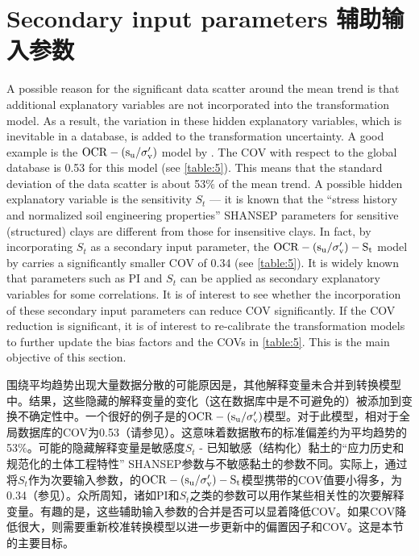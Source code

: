 \section{Secondary input parameters 辅助输入参数}

\begin{paracol}{2}

    A possible reason for the significant data scatter around the mean trend is that additional explanatory variables are not incorporated into the transformation model. As a result, the variation in these hidden explanatory variables, which is inevitable in a database, is added to the transformation uncertainty. A good example is the $\rm{OCR}-(s_u/\sigma_v')$ model by \citet{Jamiolkowski198557}. The COV with respect to the global database is 0.53 for this model (see \autoref{table:5}). This means that the standard deviation of the data scatter is about 53$\%$ of the mean trend. A possible hidden explanatory variable is the sensitivity $S_t$ — it is known that the “stress history and normalized soil engineering properties” SHANSEP parameters for sensitive (structured) clays are different from those for insensitive clays. In fact, by incorporating $S_t$ as a secondary input parameter, the $\rm{OCR}-(s_u/\sigma_v')-S_t$ model by \cite{Ching2012522}carries a significantly smaller COV of 0.34 (see \autoref{table:5}). It is widely known that parameters such as PI and $S_t$ can be applied as secondary explanatory variables for some correlations. It is of interest to see whether the incorporation of these secondary input parameters can reduce COV significantly. If the COV reduction is significant, it is of interest to re-calibrate the transformation models to further update the bias factors and the COVs in \autoref{table:5}. This is the main objective of this section.

    \switchcolumn

    围绕平均趋势出现大量数据分散的可能原因是，其他解释变量未合并到转换模型中。结果，这些隐藏的解释变量的变化（这在数据库中是不可避免的）被添加到变换不确定性中。一个很好的例子是\citet{Jamiolkowski198557}的$\rm{OCR}-(s_u/\sigma_v')$模型。对于此模型，相对于全局数据库的COV为0.53（请参见）。这意味着数据散布的标准偏差约为平均趋势的53$\%$。可能的隐藏解释变量是敏感度$S_t$ - 已知敏感（结构化）黏土的“应力历史和规范化的土体工程特性” SHANSEP参数与不敏感黏土的参数不同。实际上，通过将$S_t$作为次要输入参数，\cite{Ching2012522}的$\rm{OCR}-(s_u/\sigma_v')-S_t$模型携带的COV值要小得多，为0.34（参见）。众所周知，诸如PI和$S_t$之类的参数可以用作某些相关性的次要解释变量。有趣的是，这些辅助输入参数的合并是否可以显着降低COV。如果COV降低很大，则需要重新校准转换模型以进一步更新中的偏置因子和COV。这是本节的主要目标。

\end{paracol}

